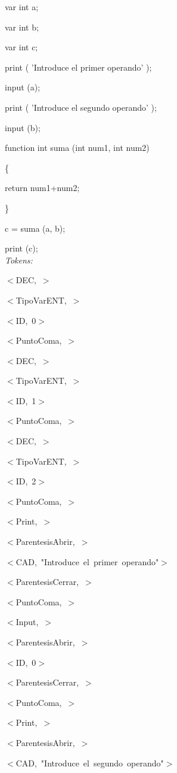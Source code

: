 \documentclass[a4paper, 12pt]{article}
\begin{document}
var int a;

var int b;

var int c;

print ( 'Introduce el primer operando' );

input (a);

print ( 'Introduce el segundo operando' );

input (b);
 
 function int suma (int num1, int num2)

\{

	return num1+num2;
	
\}

c = suma (a, b);

print (c);\medskip \\
\emph{Tokens:}


 \mbox{$<$DEC, $>$ }
 
 
 \mbox{$<$TipoVarENT, $>$ }
 
 
 \mbox{$<$ID, 0$>$ }
 
 
 \mbox{$<$PuntoComa, $>$ }
 
 
 \mbox{$<$DEC, $>$ }
 
 
 \mbox{$<$TipoVarENT, $>$ }
 
 
 \mbox{$<$ID, 1$>$ }
 
 
 \mbox{$<$PuntoComa, $>$ }
 
 
 \mbox{$<$DEC, $>$ }
 
 
 \mbox{$<$TipoVarENT, $>$ }
 
 
 \mbox{$<$ID, 2$>$ }
 
 
 \mbox{$<$PuntoComa, $>$}
 
 
 \mbox{$<$Print, $>$ }
 
 
 \mbox{$<$ParentesisAbrir, $>$ }
 
 
 \mbox{$<$CAD, \textnormal{"Introduce el primer operando"}$>$ }
 

 \mbox{$<$ParentesisCerrar, $>$ }
 
 
 \mbox{$<$PuntoComa, $>$ }
 
 
 \mbox{$<$Input, $>$ }
 
 
 \mbox{$<$ParentesisAbrir, $>$ }
 
 
 \mbox{$<$ID, 0$>$ }
 
 
 \mbox{$<$ParentesisCerrar, $>$ }
 
 
 \mbox{$<$PuntoComa, $>$ }
 
 
 \mbox{$<$Print, $>$ }
 
 
 \mbox{$<$ParentesisAbrir, $>$ }
 

 \mbox{$<$CAD, \textnormal{"Introduce el segundo operando"}$>$ }
 
\end{document}
